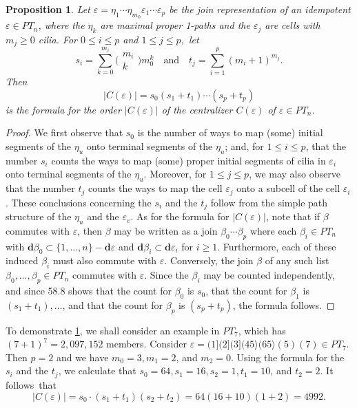 \documentclass{surv-l}
\numberwithin{equation}{section}
\numberwithin{table}{section}
\numberwithin{figure}{section}
\newtheorem{proposition}[equation]{Proposition}
\theoremstyle{definition}
\begin{document}
\begin{proposition}\label{prop12.59.1}
Let $\varepsilon
=\eta_{1}\cdots\eta_{m_{0}}\varepsilon_{1}\cdots\varepsilon_{p}$
be the join representation of an idempotent $\varepsilon \in
PT_{n}$, where the $\eta_{k}$ are maximal proper 1-paths and the
$\varepsilon_{j}$ are cells with $m_{j}\geq 0$ cilia. For $0\leq
i\leq p$ and $1\leq j\leq p$,~let
\[
s_{i}=\sum_{k=0}^{m_{i}} \big(\!\begin{smallmatrix}
m_{i}\\
k\end{smallmatrix}\!\big)m_{0}^{k}\quad \text{and}\quad t_{j}=\sum_{i=1}^{p}(m_{i}+1)^{m_{j}}.
\]
Then
\[
|C(\varepsilon)|=s_{0}(s_{1}+t_{1})\cdots(s_{p}+t_{p})
\]
is the formula for the order $|C(\varepsilon)|$ of the centralizer
$C(\varepsilon)$ of $\varepsilon\in PT_{n}$.
\end{proposition}

\begin{proof} We first observe that $s_{0}$ is the number of ways to map
(some) initial segments of the $\eta_{u}$ onto terminal segments
of the $\eta_{u}$; and, for $1\leq i\leq p$, that the number
$s_{i}$ counts the ways to map (some) proper initial segments of
cilia in $\varepsilon_{i}$ onto terminal segments of the
$\eta_{u}$. Moreover, for $1\leq j\leq p$, we may also observe
that the number $t_{j}$ counts the ways to map the cell
$\varepsilon_{j}$ onto a subcell of the cell $\varepsilon_i$.
These conclusions concerning the $s_{i}$ and the $t_{j}$ follow
from the simple path structure of the $\eta_{u}$ and the
$\varepsilon_{v}$. As for the formula for $|C(\varepsilon)|$, note
that if $\beta$ commutes with $\varepsilon$, then $\beta$ may be
written as a join $\beta_{0}\cdots\beta_{p}$ where each
$\beta_{i}\in PT_{n}$ with $\mathbf{d}\beta_{0}\subset\{1,\ldots,
n\} -\mathbf{d}\varepsilon$ and $\mathbf{d}\beta_{i}\subset
\mathbf{d}\varepsilon_{i}$ for $i\geq 1$. Furthermore, each of
these induced $\beta_{i}$ must also commute with $\varepsilon$.
Conversely, the join $\beta$ of any such list $\beta_{0},\ldots,
\beta_{p}\in PT_{n}$ commutes with $\varepsilon$. Since the
$\beta_{i}$ may be counted independently, and since 58.8 shows
that the count for $\beta_{0}$ is $s_0$, that the count for
$\beta_{1}$ is $(s_{1}+t_{1}),\ldots$, and that the count for
$\beta_{p}$ is $(s_{p}+t_{p})$, the formula follows.
\end{proof}

To demonstrate \ref{prop12.59.1}, we shall consider an example in
$PT_{7}$, which has $(7+1)^{7}=2,097,152$ members. Consider
$\varepsilon=(1](2](3](45\rangle(65\rangle(5)(7)\in PT_{7}$. Then
$p=2$ and we have $m_{0}=3, m_{1}=2$, and $m_{2}=0$. Using the
formula for the $s_{i}$ and the $t_{j}$, we calculate that
$s_{0}=64, s_{1}=16, s_{2}=1, t_{1}=10$, and $t_{2}=2$. It
follows~that
\[
|C(\varepsilon)|=s_{0}\cdot(s_{1}+t_{1})(s_{2}+t_{2})=64(16+10)(1+2)=4992.
\]
\end{document}
